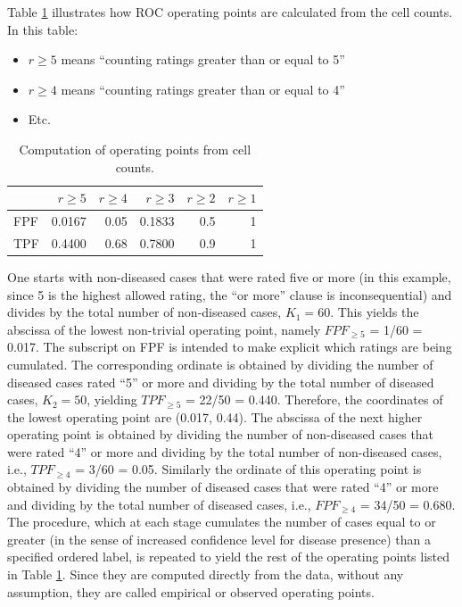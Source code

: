 \documentclass[
]{book}
\providecommand{\tightlist}{%
  \setlength{\itemsep}{0pt}\setlength{\parskip}{0pt}}
\begin{document}
Table \ref{tab:ratingsParadigmTable2} illustrates how ROC operating points are calculated from the cell counts. In this table:

\begin{itemize}
\tightlist
\item
  \(r\geq 5\) means ``counting ratings greater than or equal to 5''
\item
  \(r\geq 4\) means ``counting ratings greater than or equal to 4''
\item
  Etc.
\end{itemize}

\begin{table}

\caption{\label{tab:ratingsParadigmTable2}Computation of operating points from cell counts.}
\centering
\begin{tabular}[t]{l|r|r|r|r|r}
\hline
  & $r\geq 5$ & $r\geq 4$ & $r\geq 3$ & $r\geq 2$ & $r\geq 1$\\
\hline
FPF & 0.0167 & 0.05 & 0.1833 & 0.5 & 1\\
\hline
TPF & 0.4400 & 0.68 & 0.7800 & 0.9 & 1\\
\hline
\end{tabular}
\end{table}

One starts with non-diseased cases that were rated five or more (in this example, since 5 is the highest allowed rating, the ``or more'' clause is inconsequential) and divides by the total number of non-diseased cases, \(K_1 = 60\). This yields the abscissa of the lowest non-trivial operating point, namely \(FPF_{\ge5}\) = 1/60 = 0.017. The subscript on FPF is intended to make explicit which ratings are being cumulated. The corresponding ordinate is obtained by dividing the number of diseased cases rated ``5'' or more and dividing by the total number of diseased cases, \(K_2 = 50\), yielding \(TPF_{\ge5}\) = 22/50 = 0.440. Therefore, the coordinates of the lowest operating point are (0.017, 0.44). The abscissa of the next higher operating point is obtained by dividing the number of non-diseased cases that were rated ``4'' or more and dividing by the total number of non-diseased cases, i.e., \(TPF_{\ge4}\) = 3/60 = 0.05. Similarly the ordinate of this operating point is obtained by dividing the number of diseased cases that were rated ``4'' or more and dividing by the total number of diseased cases, i.e., \(FPF_{\ge4}\) = 34/50 = 0.680. The procedure, which at each stage cumulates the number of cases equal to or greater (in the sense of increased confidence level for disease presence) than a specified ordered label, is repeated to yield the rest of the operating points listed in Table \ref{tab:ratingsParadigmTable2}. Since they are computed directly from the data, without any assumption, they are called empirical or observed operating points.
\end{document}
